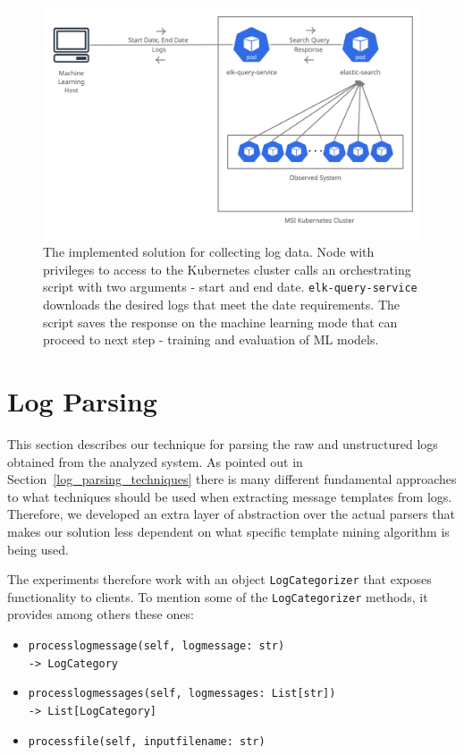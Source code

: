 \begin{figure}[!tbp]
    \includegraphics[width=\textwidth]{img/data-collection.png}		    
    \caption{The implemented solution for collecting log data. Node with privileges to access to the Kubernetes cluster calls an orchestrating script with two arguments - start and end date. \texttt{elk-query-service} downloads the desired logs that meet the date requirements. The script saves the response on the machine learning mode that can proceed to next step - training and evaluation of ML models.}
	\label{fig:data_collection_elastic}
\end{figure}

\newpage

\section{Log Parsing}
This section describes our technique for parsing the raw and unstructured logs obtained from the analyzed system.
As pointed out in Section~\ref{log_parsing_techniques} there is many different fundamental approaches to what techniques should be used when extracting message templates from logs. 
Therefore, we developed an extra layer of abstraction over the actual parsers that makes our solution less dependent on what specific template mining algorithm is being used.

The experiments therefore work with an object \texttt{LogCategorizer} that exposes functionality to clients. To mention some of the \texttt{LogCategorizer} methods, it provides among others these ones:

\begin{itemize}
    \item \texttt{process\textunderscore log\textunderscore message(self, log\textunderscore message: str)\\ -> LogCategory}
    \item \texttt{process\textunderscore log\textunderscore messages(self, log\textunderscore messages: List[str])\\ -> List[LogCategory]}
    \item \texttt{process\textunderscore file(self, input\textunderscore file\textunderscore name: str)}
\end{itemize}

